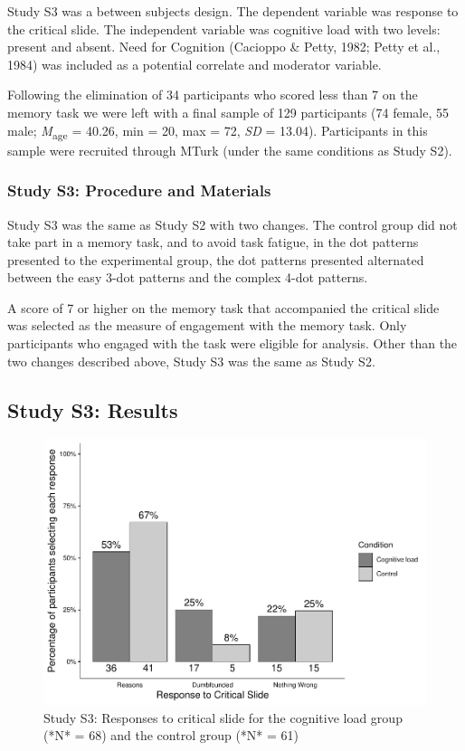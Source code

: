 \documentclass[
  american,
  man,floatsintext]{apa7}
\begin{document}
Study S3 was a between subjects design. The dependent variable was response to the critical slide. The independent variable was cognitive load with two levels: present and absent. Need for Cognition (Cacioppo \& Petty, 1982; Petty et al., 1984) was included as a potential correlate and moderator variable.

Following the elimination of 34 participants who scored less than 7 on the memory task we were left with a final sample of 129 participants (74 female, 55 male; \emph{M}\textsubscript{age} = 40.26, min = 20, max = 72, \emph{SD} = 13.04). Participants in this sample were recruited through MTurk (under the same conditions as Study S2).

\hypertarget{study-s3-procedure-and-materials}{%
\subsubsection{Study S3: Procedure and Materials}\label{study-s3-procedure-and-materials}}

Study S3 was the same as Study S2 with two changes. The control group did not take part in a memory task, and to avoid task fatigue, in the dot patterns presented to the experimental group, the dot patterns presented alternated between the easy 3-dot patterns and the complex 4-dot patterns.

A score of 7 or higher on the memory task that accompanied the critical slide was selected as the measure of engagement with the memory task. Only participants who engaged with the task were eligible for analysis. Other than the two changes described above, Study S3 was the same as Study S2.

\hypertarget{study-s3-results}{%
\subsection{Study S3: Results}\label{study-s3-results}}

\begin{figure}[!h]
\includegraphics{Supplementary_files/figure-latex/S3ch5S3fig2criticalcondition-1} \caption{Study S3: Responses to critical slide for the cognitive load group (*N* = 68) and the control group (*N* = 61)}\label{fig:S3ch5S3fig2criticalcondition}
\end{figure}
\end{document}
